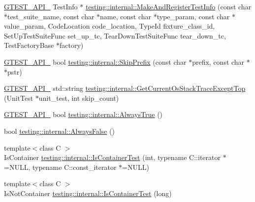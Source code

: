 \begin{DoxyCompactItemize}
\item 
\mbox{\hyperlink{_obj__test_2lib_2googletest-release-1_88_81_2googletest_2include_2gtest_2internal_2gtest-port_8h_aa73be6f0ba4a7456180a94904ce17790}{G\+T\+E\+S\+T\+\_\+\+A\+P\+I\+\_\+}} Test\+Info $\ast$ \mbox{\hyperlink{namespacetesting_1_1internal_a82087d14f1d2e6b1930237a644658d3a}{testing\+::internal\+::\+Make\+And\+Register\+Test\+Info}} (const char $\ast$test\+\_\+suite\+\_\+name, const char $\ast$name, const char $\ast$type\+\_\+param, const char $\ast$value\+\_\+param, Code\+Location code\+\_\+location, Type\+Id fixture\+\_\+class\+\_\+id, Set\+Up\+Test\+Suite\+Func set\+\_\+up\+\_\+tc, Tear\+Down\+Test\+Suite\+Func tear\+\_\+down\+\_\+tc, Test\+Factory\+Base $\ast$factory)
\item 
\mbox{\hyperlink{_obj__test_2lib_2googletest-release-1_88_81_2googletest_2include_2gtest_2internal_2gtest-port_8h_aa73be6f0ba4a7456180a94904ce17790}{G\+T\+E\+S\+T\+\_\+\+A\+P\+I\+\_\+}} bool \mbox{\hyperlink{namespacetesting_1_1internal_a244d9a3765727306b597b8992ab84036}{testing\+::internal\+::\+Skip\+Prefix}} (const char $\ast$prefix, const char $\ast$$\ast$pstr)
\item 
\mbox{\hyperlink{_obj__test_2lib_2googletest-release-1_88_81_2googletest_2include_2gtest_2internal_2gtest-port_8h_aa73be6f0ba4a7456180a94904ce17790}{G\+T\+E\+S\+T\+\_\+\+A\+P\+I\+\_\+}} std\+::string \mbox{\hyperlink{namespacetesting_1_1internal_aeb475922b8cd1e6c60ac052bbc396e62}{testing\+::internal\+::\+Get\+Current\+Os\+Stack\+Trace\+Except\+Top}} (Unit\+Test $\ast$unit\+\_\+test, int skip\+\_\+count)
\item 
\mbox{\hyperlink{_obj__test_2lib_2googletest-release-1_88_81_2googletest_2include_2gtest_2internal_2gtest-port_8h_aa73be6f0ba4a7456180a94904ce17790}{G\+T\+E\+S\+T\+\_\+\+A\+P\+I\+\_\+}} bool \mbox{\hyperlink{namespacetesting_1_1internal_a922c9da63cd4bf94fc473b9ecac76414}{testing\+::internal\+::\+Always\+True}} ()
\item 
bool \mbox{\hyperlink{namespacetesting_1_1internal_a4b24c851ab13569b1b15b3d259b60d2e}{testing\+::internal\+::\+Always\+False}} ()
\item 
{\footnotesize template$<$class C $>$ }\\Is\+Container \mbox{\hyperlink{namespacetesting_1_1internal_acb6ea1086293c1d6636e3c67941351fb}{testing\+::internal\+::\+Is\+Container\+Test}} (int, typename C\+::iterator $\ast$=N\+U\+LL, typename C\+::const\+\_\+iterator $\ast$=N\+U\+LL)
\item 
{\footnotesize template$<$class C $>$ }\\Is\+Not\+Container \mbox{\hyperlink{namespacetesting_1_1internal_af545a2ae928b8a9e7581978234464275}{testing\+::internal\+::\+Is\+Container\+Test}} (long)
$$
\end{DoxyCompactItemize}
